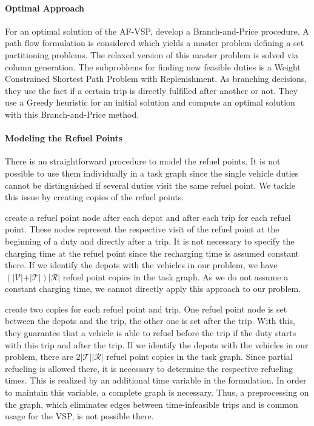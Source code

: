 \paragraph{Optimal Approach} \parfill

For an optimal solution of the AF-VSP, \cite{Adler} develop a Branch-and-Price procedure. A path flow formulation is considered which yields a master problem defining a set partitioning problems. The relaxed version of this master problem is solved via column generation. The subproblems for finding new feasible duties is a Weight Constrained Shortest Path Problem with Replenishment. As branching decisions, they use the fact if a certain trip is directly fulfilled after another or not. They use a Greedy heuristic for an initial solution and compute an optimal solution with this Branch-and-Price method.

\paragraph{Modeling the Refuel Points} \parfill

There is no straightforward procedure to model the refuel points. It is not possible to use them individually in a task graph since the single vehicle duties cannot be distinguished if several duties visit the same refuel point. We tackle this issue by creating copies of the refuel points.

\cite{Adler} create a refuel point node after each depot and after each trip for each refuel point. These nodes represent the respective visit of the refuel point at the beginning of a duty and directly after a trip. It is not necessary to specify the charging time at the refuel point since the recharging time is assumed constant there. If we identify the depots with the vehicles in our problem, we have ${\left(\vert\mathcal{V}\vert + \vert\mathcal{T}\vert\right)\vert\mathcal{R}\vert}$ refuel point copies in the task graph. As we do not assume a constant charging time, we cannot directly apply this approach to our problem.

\cite{Wen} create two copies for each refuel point and trip. One refuel point node is set between the depots and the trip, the other one is set after the trip. With this, they guarantee that a vehicle is able to refuel before the trip if the duty starts with this trip and after the trip. If we identify the depots with the vehicles in our problem, there are ${2\vert\mathcal{T}\vert\vert\mathcal{R}\vert}$ refuel point copies in the task graph. Since partial refueling is allowed there, it is necessary to determine the respective refueling times. This is realized by an additional time variable in the formulation. In order to maintain this variable, a complete graph is necessary. Thus, a preprocessing on the graph, which eliminates edges between time-infeasible trips and is common usage for the VSP, is not possible there. 

